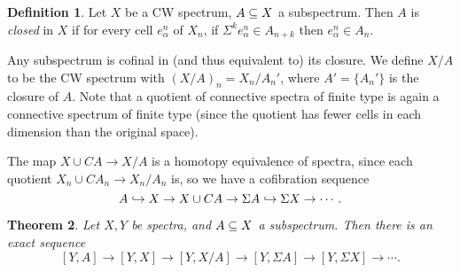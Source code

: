 \documentclass[11pt, titlepage]{article} %
\def\subq{\ensuremath\subseteq}
\def\inj{\ensuremath\hookrightarrow}
\numberwithin{equation}{subsection}
\theoremstyle{plain}
\newtheorem{theorem}{Theorem}[subsection]
\theoremstyle{definition}
\newtheorem{definition}[theorem]{Definition}
\begin{document}
\begin{definition}
Let \(X\) be a CW spectrum, \(A\subq X\) a subspectrum. Then \(A\) is \textit{closed} in \(X\) if for every cell \(e_\alpha^n\) of \(X_n\), if \(\Sigma^k e_\alpha^n \in A_{n+k}\) then \(e_\alpha^n \in A_n\). 
\end{definition}

Any subspectrum is cofinal in (and thus equivalent to) its closure. We define \(X/A\) to be the CW spectrum with \((X/A)_n=X_n/A_n'\), where \(A'=\{A_n'\}\) is the closure of \(A\). Note that a quotient of connective spectra of finite type is again a connective spectrum of finite type (since the quotient has fewer cells in each dimension than the original space).

The map \(X\cup CA\to X/A\) is a homotopy equivalence of spectra, since each quotient \(X_n \cup CA_n \to X_n/A_n\) is, so we have a cofibration sequence
\[A \inj X \to X\cup CA \to \Sigma A \inj \Sigma X \to \cdots.\]

\begin{theorem}\label{2504151709}
Let \(X,Y\) be spectra, and \(A\subq X\) a subspectrum. Then there is an exact sequence
\[[Y,A]\to[Y,X]\to[Y,X/A]\to[Y,\Sigma A]\to[Y,\Sigma X]\to\cdots.\]
\end{theorem}
\end{document}
